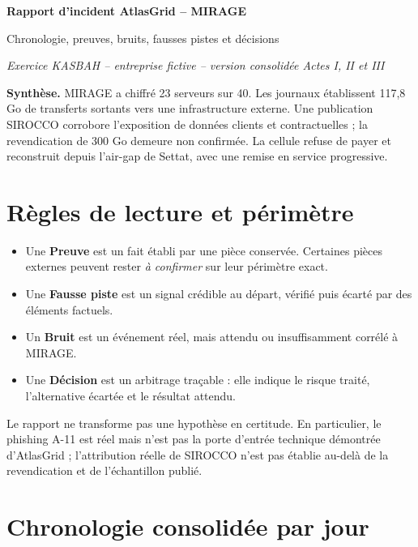 \documentclass[11pt,a4paper]{article}
\newcommand{\preuve}{\textcolor{atlasgreen}{\textbf{Preuve}}}
\newcommand{\bruit}{\textcolor{atlasorange}{\textbf{Bruit}}}
\newcommand{\faussepiste}{\textcolor{atlasred}{\textbf{Fausse piste}}}
\newcommand{\decision}{\textcolor{atlasgreen}{\textbf{Décision}}}
\begin{document}
\begin{center}
  {\Huge\bfseries\color{atlasgreen} Rapport d'incident AtlasGrid -- MIRAGE\par}
  \vspace{0.4cm}
  {\Large Chronologie, preuves, bruits, fausses pistes et décisions\par}
  \vspace{0.3cm}
  \textit{Exercice KASBAH -- entreprise fictive -- version consolidée Actes I, II et III}
\end{center}

\vspace{0.4cm}
\colorbox{atlaslight}{\parbox{0.94\textwidth}{
\textbf{Synthèse.} MIRAGE a chiffré 23 serveurs sur 40. Les journaux établissent 117,8 Go de transferts sortants vers une infrastructure externe. Une publication SIROCCO corrobore l'exposition de données clients et contractuelles ; la revendication de 300 Go demeure non confirmée. La cellule refuse de payer et reconstruit depuis l'air-gap de Settat, avec une remise en service progressive.}}

\tableofcontents
\clearpage

\section{Règles de lecture et périmètre}

\begin{itemize}[leftmargin=*]
  \item Une \preuve{} est un fait établi par une pièce conservée. Certaines pièces externes peuvent rester \emph{à confirmer} sur leur périmètre exact.
  \item Une \faussepiste{} est un signal crédible au départ, vérifié puis écarté par des éléments factuels.
  \item Un \bruit{} est un événement réel, mais attendu ou insuffisamment corrélé à MIRAGE.
  \item Une \decision{} est un arbitrage traçable : elle indique le risque traité, l'alternative écartée et le résultat attendu.
\end{itemize}

Le rapport ne transforme pas une hypothèse en certitude. En particulier, le phishing A-11 est réel mais n'est pas la porte d'entrée technique démontrée d'AtlasGrid ; l'attribution réelle de SIROCCO n'est pas établie au-delà de la revendication et de l'échantillon publié.

\section{Chronologie consolidée par jour}
\end{document}
